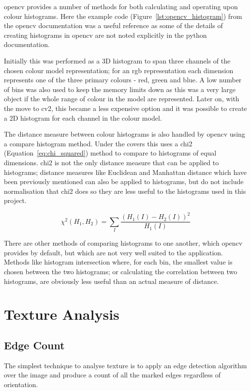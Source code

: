 \gls{opencv} provides a number of methods for both calculating and operating upon colour histograms. 
Here the example code (Figure~\ref{lst:opencv_histogram}) from the \gls{opencv} documentation was a
useful reference as some of the details of creating histograms in \gls{opencv} are not noted explicitly
in the python documentation.

Initially this was performed as a 3D histogram to span three channels of the chosen colour model 
representation; for an \gls{rgb} representation each dimension represents one of the three primary
colours - red, green and blue. A low number of bins was also used to keep the memory limits down
as this was a very large object if the whole range of colour in the model are represented.
Later on, with the move to \gls{cv2}, this became a less expensive option and it was possible to
create a 2D histogram for each channel in the colour model.

The distance measure between colour histograms is also handled by \gls{opencv} using a compare histogram
method. Under the covers this uses a \gls{chi2} (Equation~\ref{eq:chi_squared}) method to
compare to histograms of equal dimensions. \gls{chi2} is not the only distance measure that can be
applied to histograms; distance measures like Euclidean and Manhattan distance which have been 
previously mentioned can also be applied to histograms, but do not include normalisation that 
\gls{chi2} does so they are less useful to the histograms used in this project.

\begin{equation}\label{eq:chi_squared}
\chi^2(H_1,H_2) =\sum_I{\frac{(H_1(I) - H_2(I))^2}{H_1(I)}}
\end{equation}

There are other methods of comparing histograms to one another, which \gls{opencv} provides by 
default, but which are not very well suited to the application. Methods like histogram 
intersection where, for each bin, the smallest value is chosen between the two histograms; or 
calculating the correlation between two histograms, are obviously less useful than an actual 
measure of distance.


\section{Texture Analysis}

\subsection{Edge Count}
The simplest technique to analyse texture is to apply an edge detection algorithm over the image
and produce a count of all the marked edges regardless of orientation.

